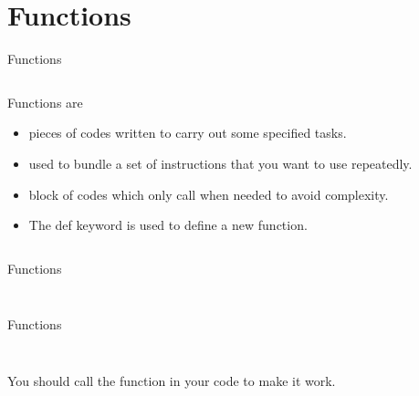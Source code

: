     \section{Functions}
        \begin{frame}{Functions}
            \begin{columns}
                \begin{column}{0.50\textwidth}
                    Functions are
                    \begin{itemize}
                        \item pieces of codes written to carry out some specified tasks.
                        \item used to bundle a set of instructions that you want to use repeatedly.
                        \item block of codes which only call when needed to avoid complexity.
                        \newline
                        \item The def keyword is used to define a new function.
                    \end{itemize}
                \end{column}
                \begin{column}{0.50\textwidth}
                    \inputminted[frame=single,framesep=2pt, lastline=8]{python3}{code-examples/function_def.py}
                    \inputminted[frame=single,framesep=2pt, lastline=8]{python3}{code-examples/function_def2.py}
                    \inputminted[frame=single,framesep=2pt, lastline=8]{python3}{code-examples/function_def3.py}
                \end{column}
            \end{columns}
        \end{frame}   
            

        \begin{frame}{Functions}
            \inputminted[frame=single,framesep=2pt, lastline=8]{python3}{code-examples/function_ex.py}
            \inputminted[frame=single,framesep=2pt, lastline=8]{python3}{code-examples/function_ex2.py}
        \end{frame}

        \begin{frame}{Functions}
            \begin{columns}
                \begin{column}{0.50\textwidth}
                \inputminted[frame=single,framesep=2pt, lastline=8]{python3}{code-examples/function_ex3.py}
                You should call the function in your code to make it work.
                \end{column}
                \begin{column}{0.50\textwidth}
                \inputminted[frame=single,framesep=2pt, lastline=15]{python3}{code-examples/function_ex4.py}
                \end{column}
            \end{columns}
        \end{frame}

